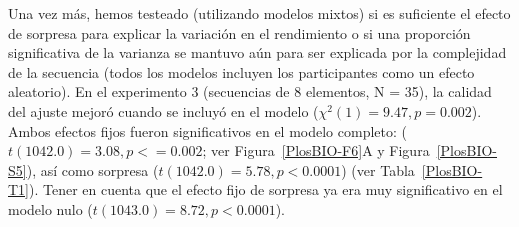 
Una vez más, hemos testeado (utilizando modelos mixtos) si es suficiente el efecto de sorpresa para explicar la variación en el rendimiento o si una proporción significativa de la varianza se mantuvo aún para ser explicada por la complejidad de la secuencia (todos los modelos incluyen los participantes como un efecto aleatorio). En el experimento 3 (secuencias de 8 elementos, N = 35), la calidad del ajuste mejoró cuando se incluyó \mdlbin en el modelo ($\chi^2(1) = 9.47, p= 0.002$). Ambos efectos fijos fueron significativos en el modelo completo: \mdlbin ($t (1042.0) = 3.08, p <= 0.002$; ver Figura~\ref{PlosBIO-F6}A y Figura~\ref{PlosBIO-S5}), así como sorpresa ($t (1042.0) = 5.78, p < 0.0001$) (ver Tabla~\ref{PlosBIO-T1}). Tener en cuenta que el efecto fijo de  sorpresa ya era muy significativo en el modelo nulo ($t (1043.0) = 8.72, p < 0.0001$).


